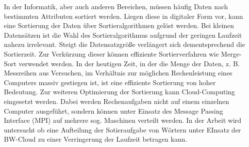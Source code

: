 In der Informatik, aber auch anderen Bereichen,  müssen häufig Daten nach bestimmten Attributen sortiert werden. Liegen diese in digitaler Form vor, kann eine Sortierung der Daten über Sortieralgorithmen gelöst werden.  Bei kleinen Datensätzen ist die Wahl des Sortieralgorithmus aufgrund der geringen Laufzeit nahezu irrelevant.  Steigt die Datensatzgröße verlängert sich dementsprechend die Sortierzeit.  Zur Verkürzung dieser können effiziente Sortierverfahren wie Merge-Sort verwendet werden.  In der heutigen Zeit, in der die Menge der Daten, z. B. Messreihen aus Versuchen, im Verhältnis zur möglichen Rechenleistung eines Computers massiv gestiegen ist, ist eine effiziente Sortierung von hoher Bedeutung. Zur weiteren Optimierung der Sortierung kann Cloud-Computing eingesetzt werden. Dabei werden Rechenaufgaben nicht auf einem einzelnen Computer ausgeführt, sondern können unter Einsatz des Message Passing Interface (MPI) auf mehrere sog. Maschinen verteilt werden. In der Arbeit wird untersucht ob eine Aufteilung der Sotieraufgabe von Wörtern unter EInsatz der BW-Cloud zu einer Verringerung der Laufzeit betragen kann.